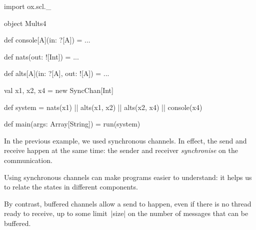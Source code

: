 \documentclass[notes,color]{sepslide0}
\begin{document}

\begin{slide}

\begin{scala}
import ox.scl._

object Mults4{
  def console[A](in: ?[A]) = ...

  def nats(out: ![Int]) = ...

  def alts[A](in: ?[A], out: ![A]) = ...

  val x1, x2, x4 = new SyncChan[Int]

  def system = nats(x1) || alts(x1, x2) || alts(x2, x4) || console(x4)

  def main(args: Array[String]) = run(system)
}
\end{scala}
\end{slide}


\begin{slide}

\begin{center}
\end{center}
\end{slide}


\begin{slide}

In the previous example, we used synchronous channels.  In effect, the send
and receive happen at the same time: the sender and receiver
\emph{synchronise} on the communication.

Using synchronous channels can make programs easier to understand: it helps us
to relate the states in different components.

By contrast, buffered channels allow a send to happen, even if there is no
thread ready to receive, up to some limit~|size| on the number of messages
that can be buffered.
\end{slide}
\end{document}
